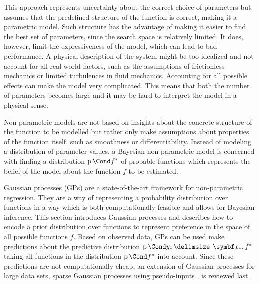 This approach represents uncertainty about the correct choice of parameters but assumes that the predefined structure of the function is correct, making it a parametric model.
Such structure has the advantage of making it easier to find the best set of parameters, since the search space is relatively limited.
It does, however, limit the expressiveness of the model, which can lead to bad performance.
A physical description of the system might be too idealized and not account for all real-world factors, such as the assumptions of frictionless mechanics or limited turbulences in fluid mechanics.
Accounting for all possible effects can make the model very complicated.
This means that both the number of parameters becomes large and it may be hard to interpret the model in a physical sense.

Non-parametric models are not based on insights about the concrete structure of the function to be modelled but rather only make assumptions about properties of the function itself, such as smoothness or differentiability.
Instead of modeling a distribution of parameter values, a Bayesian non-parametric model is concerned with finding a distribution $\Prob{f^\ast}$ of probable functions which represents the belief of the model about the function $f$ to be estimated.

Gaussian processes (GPs) are a state-of-the-art framework for non-parametric regression.
They are a way of representing a probability distribution over functions in a way which is both computationally feasible and allows for Bayesian inference.
This section introduces Gaussian processes and describes how to encode a prior distribution over functions to represent preference in the space of all possible functions $f$.
Based on observed data, GPs can be used make predictions about the predictive distribution $\Prob{y_\ast \given \mat{x_\ast}, f^\ast}$ taking all functions in the distribution $\Prob{f^\ast}$ into account.
Since these predictions are not computationally cheap, an extension of Gaussian processes for large data sets, sparse Gaussian processes using pseudo-inputs \cite{snelson_sparse_2005}, is reviewed last.

